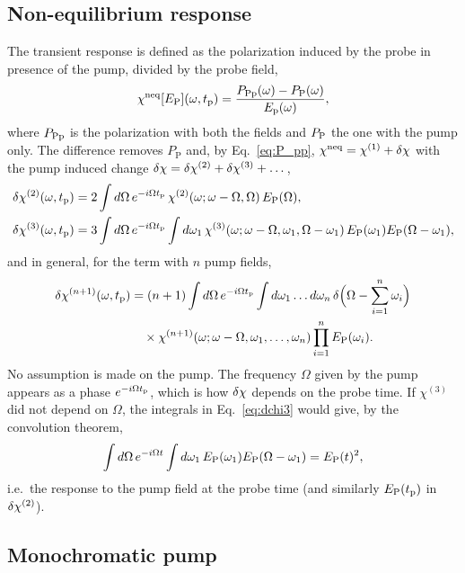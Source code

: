 \documentclass[10pt,a4paper]{paper}
\begin{document}
\subsection{Non-equilibrium response}
\label{sec:theory_neq}

The transient response is defined as the polarization induced by the probe in presence of the pump, divided by the
probe field,
\begin{equation}
\chi^{\mathrm{neq}}[E_{\mathrm{P}}](\omega,t_{\mathrm{p}}) = \frac{P_{\mathrm{Pp}}(\omega)-P_{\mathrm{P}}(\omega)}{E_{\mathrm{p}}(\omega)} ,
\label{eq:chineq}
\end{equation}
where $P_{\mathrm{Pp}}$ is the polarization with both the fields and $P_{\mathrm{P}}$ the one with the pump only. The difference removes
$P_{\mathrm{P}}$ and, by Eq.~\eqref{eq:P_pp}, $\chi^{\mathrm{neq}} = \chi^{(1)}+\delta\chi$ with the pump induced change
$\delta\chi = \delta\chi^{(2)}+\delta\chi^{(3)}+\dots$,
\begin{align}
\delta\chi^{(2)}(\omega,t_{\mathrm{p}}) &= 2\int d\Omega\,e^{-i\Omega t_{\mathrm{p}}}\,\chi^{(2)}(\omega;\omega-\Omega,\Omega)\,E_{\mathrm{P}}(\Omega) ,
\label{eq:dchi2}\\
\delta\chi^{(3)}(\omega,t_{\mathrm{p}}) &= 3\int d\Omega\,e^{-i\Omega t_{\mathrm{p}}}\int d\omega_1\,
\chi^{(3)}(\omega;\omega-\Omega,\omega_1,\Omega-\omega_1)\,E_{\mathrm{P}}(\omega_1)E_{\mathrm{P}}(\Omega-\omega_1) ,
\label{eq:dchi3}
\end{align}
and in general, for the term with $n$ pump fields,
\begin{align}
\delta\chi^{(n+1)}(\omega,t_{\mathrm{p}}) &= (n+1)\int d\Omega\,e^{-i\Omega t_{\mathrm{p}}}\int d\omega_1\dots d\omega_n\,
\delta\Big(\Omega-\sum_{i=1}^n\omega_i\Big) \nonumber\\
&\quad\times\chi^{(n+1)}(\omega;\omega-\Omega,\omega_1,\dots,\omega_n)\prod_{i=1}^nE_{\mathrm{P}}(\omega_i) .
\label{eq:dchin}
\end{align}
No assumption is made on the pump. The frequency $\Omega$ given by the pump appears as a phase $e^{-i\Omega t_{\mathrm{p}}}$, which
is how $\delta\chi$ depends on the probe time. If $\chi^{(3)}$ did not depend on $\Omega$, the integrals in
Eq.~\eqref{eq:dchi3} would give, by the convolution theorem,
\begin{equation}
\int d\Omega\,e^{-i\Omega t}\int d\omega_1\,E_{\mathrm{P}}(\omega_1)E_{\mathrm{P}}(\Omega-\omega_1) = E_{\mathrm{P}}(t)^2 ,
\label{eq:convolution}
\end{equation}
i.e.\ the response to the pump field at the probe time (and similarly $E_{\mathrm{P}}(t_{\mathrm{p}})$ in $\delta\chi^{(2)}$).

\subsection{Monochromatic pump}
\label{sec:theory_mono}
\end{document}

